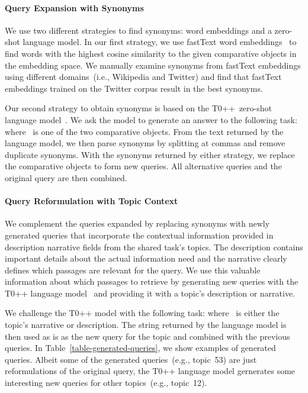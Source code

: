 \paragraph{Query Expansion with Synonyms}

We use two different strategies to find synonyms: \Ni word embeddings and \Nii a zero-shot language model.
In our first strategy, we use fastText word embeddings~\cite{BojanowskiGJM2017} to find words with the highest cosine similarity to the given comparative objects in the embedding space.
We manually examine synonyms from fastText embeddings using different domains~(i.e., Wikipedia and Twitter) and find that fastText embeddings trained on the Twitter corpus result in the best synonyms.

Our second strategy to obtain synonyms is based on the T0++~zero-shot language model~\cite{SanhWRBSACSLRDBXTSSKCNDCJWMSYPBWNRSSFFTBGBWR2021}.
We ask the model to generate an answer to the following task:  where ~is one of the two comparative objects.
From the text returned by the language model, we then parse synonyms by splitting at commas and remove duplicate synonyms.
With the synonyms returned by either strategy, we replace the comparative objects to form new queries. All alternative queries and the original query are then combined.

\paragraph{Query Reformulation with Topic Context}


We complement the queries expanded by replacing synonyms with newly generated queries that incorporate the contextual information provided in description narrative fields from the shared task's topics.
The description contains important details about the actual information need and the narrative clearly defines which passages are relevant for the query.
We use this valuable information about which passages to retrieve by generating new queries with the T0++ language model~\cite{SanhWRBSACSLRDBXTSSKCNDCJWMSYPBWNRSSFFTBGBWR2021} and providing it with a topic's description or narrative.

We challenge the T0++ model with the following task:  where ~is either the topic's narrative or description.
The string returned by the language model is then used as is as the new query for the topic and combined with the previous queries.
In Table~\ref{table-generated-queries}, we show examples of generated queries.
Albeit some of the generated queries~(e.g., topic~53) are just reformulations of the original query, the T0++ language model gernerates some interesting new queries for other topics~(e.g., topic~12).

